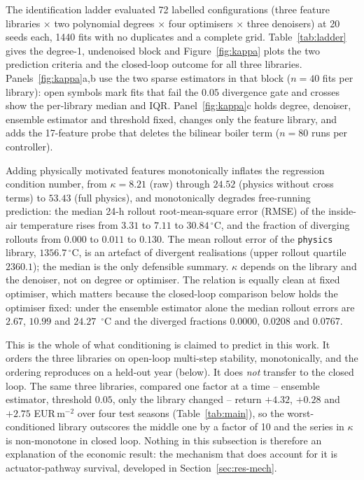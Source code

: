 The identification ladder evaluated 72 labelled configurations (three feature libraries
$\times$ two polynomial degrees $\times$ four optimisers $\times$ three denoisers) at 20
seeds each, 1440 fits with no duplicates and a complete grid. Table~\ref{tab:ladder}
gives the degree-1, undenoised block and Figure~\ref{fig:kappa} plots the two prediction
criteria and the closed-loop outcome for all three libraries.
Panels~\ref{fig:kappa}a,b use the two sparse estimators in that block ($n=40$ fits per
library): open symbols mark fits that fail the $0.05$ divergence gate and crosses show the
per-library median and IQR. Panel~\ref{fig:kappa}c holds degree, denoiser, ensemble
estimator and threshold fixed, changes only the feature library, and adds the 17-feature
probe that deletes the bilinear boiler term ($n=80$ runs per controller).

Adding physically motivated features monotonically inflates the regression condition
number, from $\kappa=8.21$ (raw) through $24.52$ (physics without cross terms) to $53.43$
(full physics), and monotonically degrades free-running prediction: the median 24-h
rollout root-mean-square error (RMSE) of the inside-air temperature rises from $3.31$ to $7.11$ to $30.84\,^\circ$C,
and the fraction of diverging rollouts from $0.000$ to $0.011$ to $0.130$. The mean
rollout error of the \texttt{physics} library, $1356.7\,^\circ$C, is an artefact of
divergent realisations (upper rollout quartile $2360.1$); the median is the only defensible
summary. $\kappa$ depends on the library and the denoiser, not on degree or optimiser. The
relation is equally clean at fixed optimiser, which matters because the closed-loop
comparison below holds the optimiser fixed: under the ensemble estimator alone the median
rollout errors are $2.67$, $10.99$ and $24.27$~$^\circ$C and the diverged fractions
$0.0000$, $0.0208$ and $0.0767$.

This is the whole of what conditioning is claimed to predict in this work. It orders the
three libraries on open-loop multi-step stability, monotonically, and the ordering
reproduces on a held-out year (below). It does \emph{not} transfer to the closed loop. The
same three libraries, compared one factor at a time -- ensemble estimator, threshold
$0.05$, only the library changed -- return $+4.32$, $+0.28$ and $+2.75$ EUR\,m$^{-2}$ over
four test seasons (Table~\ref{tab:main}), so the worst-conditioned library outscores the
middle one by a factor of 10 and the series in $\kappa$ is non-monotone in closed loop.
Nothing in this subsection is therefore an explanation of the economic result: the
mechanism that does account for it is actuator-pathway survival, developed in
Section~\ref{sec:res-mech}.

